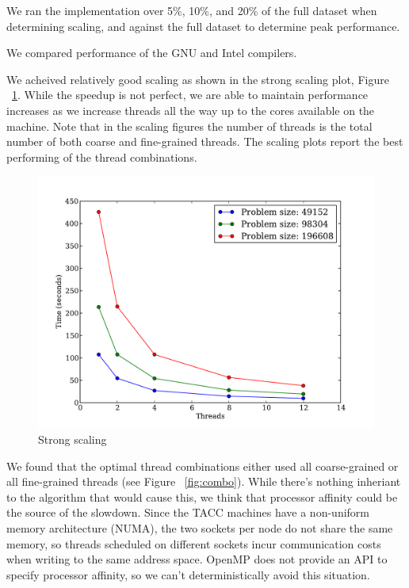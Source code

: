 \documentclass[11pt,onecolumn]{article}
\begin{document}
We ran the implementation over 5\%, 10\%, and 20\% of the full dataset when determining scaling, and against the full dataset to determine peak performance.

We compared performance of the GNU and Intel compilers.


We acheived relatively good scaling as shown in the strong scaling plot, Figure ~\ref{fig:strong_scaling}. While the speedup is not perfect, we are able to maintain performance increases as we increase threads all the way up to the cores available on the machine. Note that in the scaling figures the number of threads is the total number of both coarse and fine-grained threads. The scaling plots report the best performing of the thread combinations.

\begin{figure}[h!]
\centering
\includegraphics[width=.75\linewidth]{figures/intel_strong_scaling}
\caption{Strong scaling}
\label{fig:strong_scaling}
\end{figure}

We found that the optimal thread combinations either used all coarse-grained or all fine-grained threads (see Figure ~\ref{fig:combo}). While there's nothing inheriant to the algorithm that would cause this, we think that processor affinity could be the source of the slowdown. Since the TACC machines have a non-uniform memory architecture (NUMA), the two sockets per node do not share the same memory, so threads scheduled on different sockets incur communication costs when writing to the same address space. OpenMP does not provide an API to specify processor affinity, so we can't deterministically avoid this situation.
\end{document}
